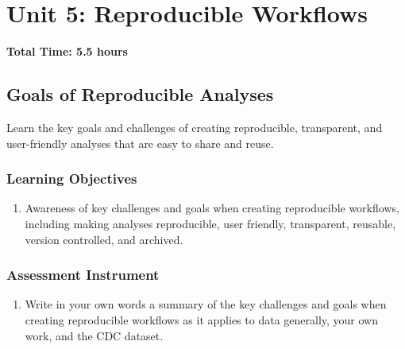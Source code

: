







\chapter{Unit 5: Reproducible Workflows}
\label{chap:unit5}

\textbf{Total Time: 5.5 hours}

\section{Goals of Reproducible Analyses}
\label{sec:5.1}

Learn the key goals and challenges of creating reproducible, transparent, and user-friendly analyses that are easy to share and reuse.

\subsection{Learning Objectives}

\begin{enumerate}
    \item Awareness of key challenges and goals when creating reproducible workflows, including making analyses reproducible, user friendly, transparent, reusable, version controlled, and archived.
\end{enumerate}

\subsection{Assessment Instrument}

\begin{enumerate}
    \item Write in your own words a summary of the key challenges and goals when creating reproducible workflows as it applies to data generally, your own work, and the CDC dataset.
\end{enumerate}

